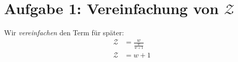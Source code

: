 \documentclass{article}
\begin{document}
\section{Aufgabe 1: Vereinfachung von \(\mathcal{Z}\)}
Wir \textit{vereinfachen} den Term für später:
\begin{align}
	\mathcal{Z} &= \frac{w}{ \frac{w}{w+1} } \\
	\mathcal{Z} &= w+1
\end{align}
\end{document}
